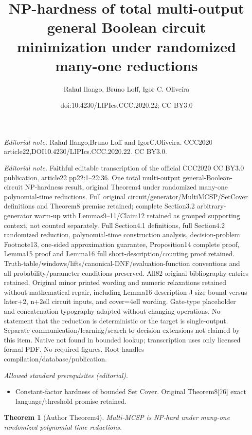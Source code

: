 \documentclass[10pt,a4paper]{article}
\title{NP-hardness of total multi-output general Boolean circuit minimization under randomized many-one reductions}
\author{Rahul Ilango, Bruno Loff, Igor C. Oliveira}
\date{doi:10.4230/LIPIcs.CCC.2020.22; CC BY3.0}
\newtheorem{nttheorem}{Theorem}
\begin{document}
\maketitle
\noindent\textit{Editorial note.} Rahul Ilango,Bruno Loff and IgorC.Oliveira. CCC2020 article22,DOI10.4230/LIPIcs.CCC.2020.22. CC BY3.0.\par\medskip
\noindent\textit{Editorial note.} Faithful editable transcription of the official CCC2020 CC BY3.0 publication, article22 pp22:1--22:36. One total multi-output general-Boolean-circuit NP-hardness result, original Theorem4 under randomized many-one polynomial-time reductions. Full original circuit/generator/MultiMCSP/SetCover definitions and Theorem8 premise retained; complete Section3.2 arbitrary-generator warm-up with Lemmas9--11/Claim12 retained as grouped supporting context, not counted separately. Full Section4.1 definitions, full Section4.2 randomized reduction, polynomial-time construction analysis, decision-problem Footnote13, one-sided approximation guarantee, Proposition14 complete proof, Lemma15 proof and Lemma16 full short-description/counting proof retained. Truth-table/windows/lifts/canonical-DNF/evaluation-function conventions and all probability/parameter conditions preserved. All82 original bibliography entries retained. Original minor printed wording and numeric relaxations retained without mathematical repair, including Lemma16 description J-size bound versus later+2, n+2ell circuit inputs, and cover=4ell wording. Gate-type placeholder and concatenation typography adapted without changing operations. No statement that the reduction is deterministic or the target is single-output. Separate communication/learning/search-to-decision extensions not claimed by this item. Native not found in bounded lookup; transcription uses only licensed formal PDF. No required figures. Root handles compilation/database/publication.\par\medskip
\noindent\textit{Allowed standard prerequisites (editorial).}\begin{itemize}
\item Constant-factor hardness of bounded Set Cover. Original Theorem8[76] exact language/threshold promise retained.
\end{itemize}\medskip
\setcounter{nttheorem}{3}
\begin{nttheorem}[Author Theorem4]
Multi-MCSP is NP-hard under many-one randomized polynomial time reductions.
\end{nttheorem}
\end{document}
